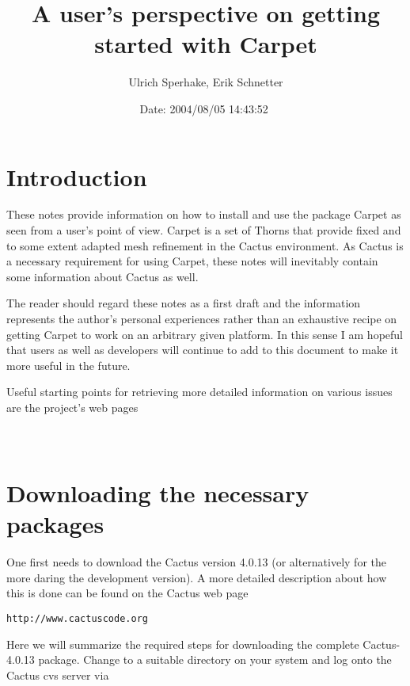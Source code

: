 \documentclass[11pt]{article}
\numberwithin{equation}{section}
\begin{document}
\title{A user's perspective on getting started with Carpet}
\author{Ulrich Sperhake, Erik Schnetter}
\date{$ $Date: 2004/08/05 14:43:52 $ $}
\maketitle



\section{Introduction}

These notes provide information on how to install and use the package
Carpet as seen from a user's point of view. Carpet is a set of Thorns
that provide fixed and to some extent adapted mesh refinement in
the Cactus environment. As Cactus is a necessary requirement for
using Carpet, these notes will inevitably contain some information about
Cactus as well.

The reader should regard these notes as a first draft and the information
represents the author's personal experiences rather than an exhaustive
recipe on getting Carpet to work on an arbitrary given platform. In this sense I
am hopeful that users as well as developers will continue to add to this
document to make it more useful in the future.

Useful starting points for retrieving more detailed information on
various issues are the project's web pages\\

\hspace{1cm}{\tt http://www.cactuscode.org}\\

\hspace{1cm}{\tt http://www.carpetcode.org}\\


\section{Downloading the necessary packages}

One first needs to download the Cactus version 4.0.13 (or
alternatively for the more daring the development version).
A more detailed description about how this is done can be found on the
Cactus web page
%
\begin{center}
  {\tt http://www.cactuscode.org}
\end{center}
%
Here we will summarize the required steps for downloading the complete
Cactus-4.0.13 package. Change to a suitable directory on your system
and log onto the Cactus cvs server via\\
\end{document}

